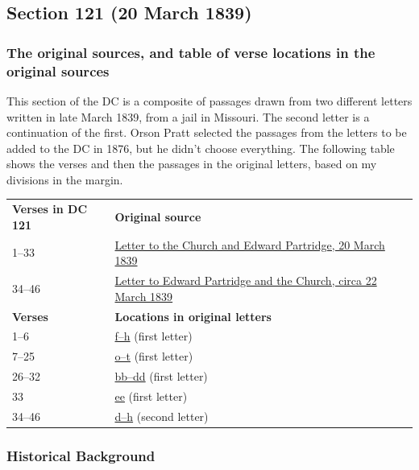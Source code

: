 \subsection{Section 121 (20 March 1839)}
	\label{DC121}
	
	\subsubsection{The original sources, and table of verse locations in the original sources}
	
		This section of the DC is a composite of passages drawn from two different letters written in late March 1839, from a jail in Missouri. The second letter is a continuation of the first. Orson Pratt selected the passages from the letters to be added to the DC in 1876, but he didn't choose everything. The following table shows the verses and then the passages in the original letters, based on my divisions in the margin.
		
		\begin{table}[H]
			\centering
			\begin{tabular}{p{4cm}p{10cm}}
				\textbf{Verses in DC 121} & \textbf{Original source} \\
				1--33 & \hyperref[EMS-1839-JS-20-MAR-1839]{Letter to the Church and Edward Partridge, 20 March 1839} \\
				34--46 & \hyperref[EMS-1839-JS-CIR-22-MAR-1839]{Letter to Edward Partridge and the Church, circa 22 March 1839} \\
				\textbf{Verses} & \textbf{Locations in original letters} \\
				1--6 & \hyperlink{EMS-1839-JS-20-MAR-1839-f}{f--h} (first letter) \\
				7--25 & \hyperlink{EMS-1839-JS-20-MAR-1839-o}{o--t} (first letter) \\
				26--32 & \hyperlink{EMS-1839-JS-20-MAR-1839-bb}{bb--dd} (first letter) \\
				33 & \hyperlink{EMS-1839-JS-20-MAR-1839-ee}{ee} (first letter) \\
				34--46 & \hyperlink{EMS-1839-JS-CIR-22-MAR-1839-d}{d--h} (second letter) \\
			\end{tabular}
		\end{table}
	
	\subsubsection{Historical Background}
		\label{DC121-HB}
		
